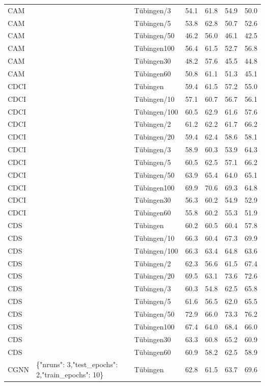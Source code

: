 \begin{tabular}{lllllll}
CAM &  & Tübingen/3 & 54.1 & 61.8 & 54.9 & 50.0 \\
CAM &  & Tübingen/5 & 53.8 & 62.8 & 50.7 & 52.6 \\
CAM &  & Tübingen/50 & 46.2 & 56.0 & 46.1 & 42.5 \\
CAM &  & Tübingen100 & 56.4 & 61.5 & 52.7 & 56.8 \\
CAM &  & Tübingen30 & 48.2 & 57.6 & 45.5 & 44.8 \\
CAM &  & Tübingen60 & 50.8 & 61.1 & 51.3 & 45.1 \\
CDCI &  & Tübingen & 59.4 & 61.5 & 57.2 & 55.0 \\
CDCI &  & Tübingen/10 & 57.1 & 60.7 & 56.7 & 56.1 \\
CDCI &  & Tübingen/100 & 60.5 & 62.9 & 61.6 & 57.6 \\
CDCI &  & Tübingen/2 & 61.2 & 62.2 & 61.7 & 66.2 \\
CDCI &  & Tübingen/20 & 59.4 & 62.4 & 58.6 & 58.1 \\
CDCI &  & Tübingen/3 & 58.9 & 60.3 & 53.9 & 64.3 \\
CDCI &  & Tübingen/5 & 60.5 & 62.5 & 57.1 & 66.2 \\
CDCI &  & Tübingen/50 & 63.9 & 65.4 & 64.0 & 65.1 \\
CDCI &  & Tübingen100 & 69.9 & 70.6 & 69.3 & 64.8 \\
CDCI &  & Tübingen30 & 56.3 & 60.2 & 54.9 & 52.9 \\
CDCI &  & Tübingen60 & 55.8 & 60.2 & 55.3 & 51.9 \\
CDS &  & Tübingen & 60.2 & 60.5 & 60.4 & 57.8 \\
CDS &  & Tübingen/10 & 66.3 & 60.4 & 67.3 & 69.9 \\
CDS &  & Tübingen/100 & 66.3 & 63.4 & 64.8 & 63.6 \\
CDS &  & Tübingen/2 & 62.3 & 56.6 & 61.5 & 67.4 \\
CDS &  & Tübingen/20 & 69.5 & 63.1 & 73.6 & 72.6 \\
CDS &  & Tübingen/3 & 60.3 & 54.8 & 62.5 & 65.8 \\
CDS &  & Tübingen/5 & 61.6 & 56.5 & 62.0 & 65.5 \\
CDS &  & Tübingen/50 & 72.9 & 66.0 & 73.3 & 76.2 \\
CDS &  & Tübingen100 & 67.4 & 64.0 & 68.4 & 66.0 \\
CDS &  & Tübingen30 & 63.3 & 60.8 & 65.2 & 60.9 \\
CDS &  & Tübingen60 & 60.9 & 58.2 & 62.5 & 58.9 \\
CGNN & \{"nruns": 3,"test\_epochs": 2,"train\_epochs": 10\} & Tübingen & 62.8 & 61.5 & 63.7 & 69.6 \\

\end{tabular}
